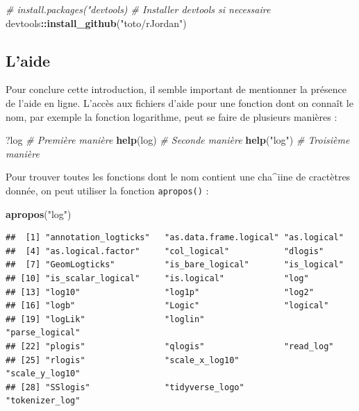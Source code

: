 \documentclass[
  11pt,
]{book}
\newenvironment{Shaded}{\begin{snugshade}}{\end{snugshade}}
\newcommand{\CommentTok}[1]{\textcolor[rgb]{0.56,0.35,0.01}{\textit{#1}}}
\newcommand{\KeywordTok}[1]{\textcolor[rgb]{0.13,0.29,0.53}{\textbf{#1}}}
\newcommand{\NormalTok}[1]{#1}
\newcommand{\OperatorTok}[1]{\textcolor[rgb]{0.81,0.36,0.00}{\textbf{#1}}}
\newcommand{\StringTok}[1]{\textcolor[rgb]{0.31,0.60,0.02}{#1}}
\numberwithin{equation}{section}
\numberwithin{countremarque}{section}
\begin{document}
\begin{Shaded}
\begin{Highlighting}[]
\CommentTok{\# install.packages("devtools) \# Installer devtools si necessaire}
\NormalTok{devtools}\OperatorTok{::}\KeywordTok{install\_github}\NormalTok{(}\StringTok{"toto/rJordan"}\NormalTok{)}
\end{Highlighting}
\end{Shaded}

\hypertarget{laide}{%
\subsection{L'aide}\label{laide}}

Pour conclure cette introduction, il semble important de mentionner la présence de l'aide en ligne. L'accès aux fichiers d'aide pour une fonction dont on connaît le nom, par exemple la fonction logarithme, peut se faire de plusieurs manières :

\begin{Shaded}
\begin{Highlighting}[]
\NormalTok{?log }\CommentTok{\# Première manière}
\KeywordTok{help}\NormalTok{(log) }\CommentTok{\# Seconde manière}
\KeywordTok{help}\NormalTok{(}\StringTok{"log"}\NormalTok{) }\CommentTok{\# Troisième manière}
\end{Highlighting}
\end{Shaded}

Pour trouver toutes les fonctions dont le nom contient une cha\^{}iine de cractètres donnée, on peut utiliser la fonction \texttt{apropos()} :

\begin{Shaded}
\begin{Highlighting}[]
\KeywordTok{apropos}\NormalTok{(}\StringTok{"log"}\NormalTok{)}
\end{Highlighting}
\end{Shaded}

\begin{lstlisting}
##  [1] "annotation_logticks"   "as.data.frame.logical" "as.logical"           
##  [4] "as.logical.factor"     "col_logical"           "dlogis"               
##  [7] "GeomLogticks"          "is_bare_logical"       "is_logical"           
## [10] "is_scalar_logical"     "is.logical"            "log"                  
## [13] "log10"                 "log1p"                 "log2"                 
## [16] "logb"                  "Logic"                 "logical"              
## [19] "logLik"                "loglin"                "parse_logical"        
## [22] "plogis"                "qlogis"                "read_log"             
## [25] "rlogis"                "scale_x_log10"         "scale_y_log10"        
## [28] "SSlogis"               "tidyverse_logo"        "tokenizer_log"
\end{lstlisting}
\end{document}
